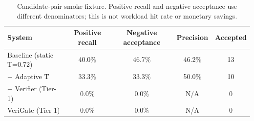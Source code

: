 \begin{table}[H]
\centering
\footnotesize
\caption{Candidate-pair smoke fixture. Positive recall and negative acceptance use different denominators; this is not workload hit rate or monetary savings.}
\label{tab:ablation}
\begin{tabular}{|l|c|c|c|c|}
\hline
System & Positive recall & Negative acceptance & Precision & Accepted \\ \hline
Baseline (static T=0.72) & 40.0\% & 46.7\% & 46.2\% & 13 \\ \hline
+ Adaptive T & 33.3\% & 33.3\% & 50.0\% & 10 \\ \hline
+ Verifier (Tier-1) & 0.0\% & 0.0\% & N/A & 0 \\ \hline
VeriGate (Tier-1) & 0.0\% & 0.0\% & N/A & 0 \\ \hline
\end{tabular}
\end{table}
